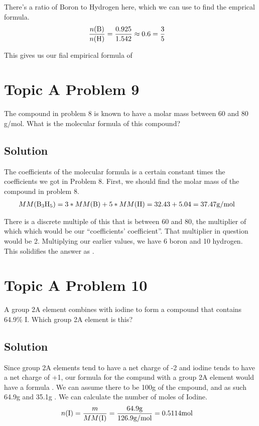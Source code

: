 \documentclass[10pt]{article}
\begin{document}
            There's a ratio of Boron to Hydrogen here, which we can use to find the emprical formula.
            \begin{align}
                \frac{n(\ce{B})}{n(\ce{H})} &=  \frac{0.925}{1.542} \approx 0.6 = \frac{3}{5}
            \end{align}

            This gives us our fial empirical formula of 

    \pagebreak
    \section{Topic A Problem 9}
        The compound in problem 8 is known to have a molar mass between 60 and 80 g/mol. 
        What is the molecular formula of this compound?
            
        \subsection{Solution}
            The coefficients of the molecular formula is a certain constant times the coefficients we got in Problem 8.
            First, we should find the molar mass of the compound in problem 8.
            \begin{align}
                MM(\ce{B3H5})   &=  3 * MM(\ce{B}) + 5 * MM(\ce{H})
                    =   32.43 + 5.04
                    =   37.47 \unit{\gram/\mole}
            \end{align}

            There is a discrete multiple of this that is between 60 and 80, the multiplier of which which would be our ``coefficients' coefficient''.
            That multiplier in question would be 2.
            Multiplying our earlier values, we have 6 boron and 10 hydrogen.
            This solidifies the answer as .

    \pagebreak
    \section{Topic A Problem 10}
        A group 2A element combines with iodine to form a compound that contains 64.9\% I. 
        Which group 2A element is this? 

        \subsection{Solution}
            Since group 2A elements tend to have a net charge of -2 and iodine tends to have a net charge of +1, our formula for the compund with a group 2A element  would have a formula .
            We can assume there to be 100\unit{\gram} of the cmpound, and as such 64.9\unit{\gram}  and 35.1\unit{\gram} .
            We can calculate the number of moles of Iodine.
            \begin{align}
                n(\ce{I})   &=  \frac{m}{MM(\ce{I})}
                    =   \frac{64.9\unit{\gram}}{126.9 \unit{\gram/\mole}}
                    =   0.5114 \unit{\mole}
            \end{align}
\end{document}
